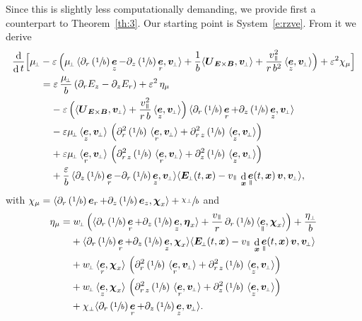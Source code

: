 \documentclass[JEP,XML,SOM,Unicode]{cedram}
\newcommand{\sperp}{{\scriptscriptstyle\perp}}
\let\eps\varepsilon
\let\d\partial
\DeclareMathOperator\dD{d}\let\dd\dD
\theoremstyle{plain}
\theoremstyle{definition}
\newcommand\bB{{\boldsymbol B}}
\newcommand\bE{{\boldsymbol E}}
\newcommand\bU{{\boldsymbol U}}
\newcommand\bfv{{\boldsymbol v}}
\newcommand\bfx{{\boldsymbol x}}
\newcommand\bfeta{{\boldsymbol \eta}}
\newcommand\bfchi{{\boldsymbol \chi}}
\DeclareMathOperator{\beD}{\boldsymbol{e}}
\newcommand\eDr{\beD_r}
\newcommand\eDz{\beD_z}
\newcommand\eDpar{\beD_\mypar}
\newcommand\vpar{v_\mypar}
\newcommand\bvperp{\bfv_{\!\sperp}}
\newcommand\eperp{w_{\!\sperp}}
\newcommand\muperp{\mu_{\!\sperp}}
\newcommand\Eperp{\bE_{\!\sperp}}
\newcommand\Er{E_r}
\newcommand\Ez{E_z}
\newcommand{\EcB}{\bU_{\bE\times\bB}}
\newcommand{\mypar}{{\mkern3mu\vphantom{\perp}\vrule depth 0pt\mkern2mu\vrule depth 0pt\mkern3mu}}
\begin{document}
Since this is slightly less computationally demanding, we provide first a counterpart to Theorem~\ref{th:3}. Our starting point is System~\eqref{e:rzve}. From it we derive
\begin{align*}
\frac{\dD}{\dD t}\Bigl[\muperp&
-\eps\,\Bigl(
\muperp\,\langle
\d_r\left(\sfrac1b\right)\eDz-\d_z\left(\sfrac1b\right)\eDr,\bvperp\rangle +\frac1b\langle\EcB,\bvperp\rangle
+\frac{\vpar^2}{r\,b^2}
\,\langle\eDz,\bvperp\rangle
\Bigr)+\eps^2\chi_\mu\Bigr]\\
&=
\eps\,\frac{\muperp}{b}\left(\d_r\Ez-\d_z\Er\right)
+\eps^2\,\eta_\mu\\
&\hphantom{={}}-\eps\,
\Bigl(\langle\EcB,\bvperp\rangle
+\frac{\vpar^2}{r\,b}
\,\langle\eDz,\bvperp\rangle
\Bigr)
\,\langle
\d_r\left(\sfrac1b\right)\eDr
+\d_z\left(\sfrac1b\right)\eDz
,\bvperp\rangle\\
&\hphantom{={}}
-\eps\muperp\,\langle\eDz,\bvperp\rangle\,\left(
\d_r^2\left(\sfrac1b\right)\,\langle\eDr,\bvperp\rangle
+\d_{r\,z}^2\left(\sfrac1b\right)\,\langle\eDz,\bvperp\rangle
\right)
\\
&\hphantom{={}}
+\eps\muperp\,\langle\eDr,\bvperp\rangle\,
\left(\d_{r\,z}^2\left(\sfrac1b\right)\,\langle\eDr,\bvperp\rangle
+\d_z^2\left(\sfrac1b\right)\,\langle\eDz,\bvperp\rangle
\right)
\\
&\hphantom{={}}
+\frac{\eps}{b}\,
\langle\d_z\left(\sfrac1b\right)\eDr
-\d_r\left(\sfrac1b\right)\eDz,
\bvperp\rangle\langle \Eperp(t,\bfx)-\vpar\,
\dD_{\bfx}\eDpar(t,\bfx)\,\bfv,
\bvperp\rangle,
\end{align*}
with
$\chi_\mu
=
\langle\d_r\left(\sfrac1b\right)\eDr
+\d_z\left(\sfrac1b\right)\eDz,\bfchi_x\rangle
+\sfrac{\chi_\sperp}{b}$
and
\begin{align*}
\eta_\mu&=
\eperp\,\Bigl(\langle\d_r\left(\sfrac1b\right)\eDr+\d_z\left(\sfrac1b\right)\eDz,\bfeta_x\rangle+\frac{\vpar}{r}\,\d_r\left(\sfrac1b\right)\langle\eDpar,\bfchi_x\rangle\Bigr)
+\frac{\eta_\sperp}{b}\\
&\hphantom{={}}
+\langle
\d_r\left(\sfrac1b\right)\eDr
+\d_z\left(\sfrac1b\right)\eDz,\bfchi_x\rangle
\langle \Eperp(t,\bfx)-\vpar\,
\dD_{\bfx}\eDpar(t,\bfx)\,\bfv,
\bvperp\rangle
\\
&\hphantom{={}}
+\eperp\,\langle\eDr,\bfchi_x\rangle\,\left(
\d_r^2\left(\sfrac1b\right)\,\langle\eDr,\bvperp\rangle
+\d_{r\,z}^2\left(\sfrac1b\right)\,\langle\eDz,\bvperp\rangle
\right)
\\
&\hphantom{={}}
+\eperp\,\langle\eDz,\bfchi_x\rangle\,\left(
\d_{r\,z}^2\left(\sfrac1b\right)\,\langle\eDr,\bvperp\rangle
+\d_z^2\left(\sfrac1b\right)\,\langle\eDz,\bvperp\rangle
\right)
\\
&\hphantom{={}}
+\chi_\sperp\langle
\d_r\left(\sfrac1b\right)\eDr
+\d_z\left(\sfrac1b\right)\eDz
,\bvperp\rangle.
\end{align*}
\end{document}
